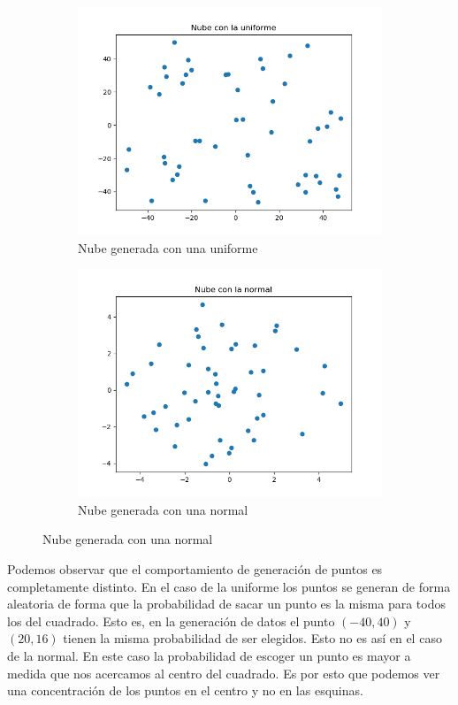 \documentclass[12pt,a4paper]{article}
\begin{document}
\begin{figure}[H]
	\centering
	\begin{subfigure}{0.47\textwidth}
		\includegraphics[scale=0.55]{./Imagenes/ej1-1.png}
		\caption{Nube generada con una uniforme}
	\end{subfigure}
	\begin{subfigure}{0.47\textwidth}
		\includegraphics[scale=0.55]{./Imagenes/ej1-2.png}
		\caption{Nube generada con una normal}
	\end{subfigure}
\end{figure}

Podemos observar que el comportamiento de generación de puntos es completamente distinto. En el caso de la uniforme los puntos se generan de forma aleatoria de forma que la probabilidad de sacar un punto es la misma para todos los del cuadrado. Esto es, en la generación de datos el punto $(-40,40)$ y $(20,16)$ tienen la misma probabilidad de ser elegidos. Esto no es así en el caso de la normal. En este caso la probabilidad de escoger un punto es mayor a medida que nos acercamos al centro del cuadrado. Es por esto que podemos ver una concentración de los puntos en el centro y no en las esquinas.
\end{document}
